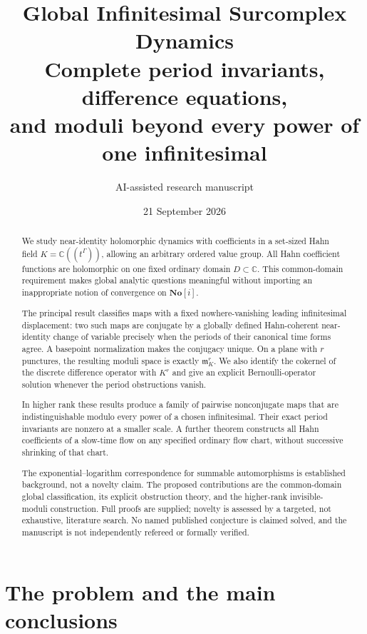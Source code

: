\documentclass[11pt,a4paper]{article}
\title{\textbf{Global Infinitesimal Surcomplex Dynamics}\\[5pt]
\large Complete period invariants, difference equations,\\
and moduli beyond every power of one infinitesimal}
\author{AI-assisted research manuscript}
\date{21 September 2026}
\numberwithin{equation}{section}
\theoremstyle{definition}
\theoremstyle{remark}
\newcommand{\C}{\mathbb C}
\newcommand{\No}{\mathbf{No}}
\newcommand{\mm}{\mathfrak m}
\begin{document}
\maketitle
\begin{abstract}
We study near-identity holomorphic dynamics with coefficients in a set-sized
Hahn field $K=\C((t^\Gamma))$, allowing an arbitrary ordered value group.
All Hahn coefficient functions are holomorphic on one fixed ordinary domain
$D\subset\C$.  This common-domain requirement makes global analytic questions
meaningful without importing an inappropriate notion of convergence on
$\No[i]$.

The principal result classifies maps with a fixed nowhere-vanishing leading
infinitesimal displacement: two such maps are conjugate by a globally defined
Hahn-coherent near-identity change of variable precisely when the periods of
their canonical time forms agree.  A basepoint normalization makes the
conjugacy unique.  On a plane with $r$ punctures, the resulting moduli space is
exactly $\mm_K^r$.  We also identify the cokernel of the discrete difference
operator with $K^r$ and give an explicit Bernoulli-operator solution whenever
the period obstructions vanish.

In higher rank these results produce a family of pairwise nonconjugate maps
that are indistinguishable modulo every power of a chosen infinitesimal.
Their exact period invariants are nonzero at a smaller scale.  A further
theorem constructs all Hahn coefficients of a slow-time flow on any specified
ordinary flow chart, without successive shrinking of that chart.

The exponential--logarithm correspondence for summable automorphisms is
established background, not a novelty claim.  The proposed contributions are
the common-domain global classification, its explicit obstruction theory,
and the higher-rank invisible-moduli construction.  Full proofs are supplied;
novelty is assessed by a targeted, not exhaustive, literature search.  No
named published conjecture is claimed solved, and the manuscript is not
independently refereed or formally verified.
\end{abstract}

\newpage
{\fontsize{10}{11}\selectfont\setlength{\parskip}{0pt}\tableofcontents}
\newpage

\section{The problem and the main conclusions}
\label{sec:introduction}
\end{document}
